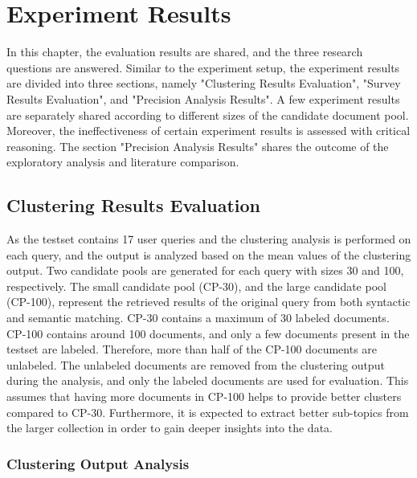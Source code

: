 
\chapter{Experiment Results}

In this chapter, the evaluation results are shared, and the three research questions are answered. Similar to the experiment setup, the experiment results are divided into three sections, namely "Clustering Results Evaluation", "Survey Results Evaluation", and "Precision Analysis Results". A few experiment results are separately shared according to different sizes of the candidate document pool. Moreover, the ineffectiveness of certain experiment results is assessed with critical reasoning. The section "Precision Analysis Results" shares the outcome of the exploratory analysis and literature comparison.

\section{Clustering Results Evaluation}

As the testset contains 17 user queries and the clustering analysis is performed on each query, and the output is analyzed based on the mean values of the clustering output. Two candidate pools are generated for each query with sizes 30 and 100, respectively. The small candidate pool (CP-30), and the large candidate pool (CP-100), represent the retrieved results of the original query from both syntactic and semantic matching. CP-30 contains a maximum of 30 labeled documents. CP-100 contains around 100 documents, and only a few documents present in the testset are labeled. Therefore, more than half of the CP-100 documents are unlabeled. The unlabeled documents are removed from the clustering output during the analysis, and only the labeled documents are used for evaluation. This assumes that having more documents in CP-100 helps to provide better clusters compared to CP-30. Furthermore, it is expected to extract better sub-topics from the larger collection in order to gain deeper insights into the data.

\subsection{Clustering Output Analysis}

